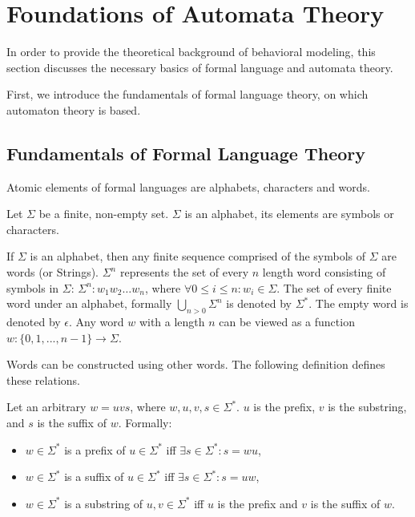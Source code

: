\section{Foundations of Automata Theory}
In order to provide the theoretical background of behavioral modeling, this section discusses the necessary basics of formal language and automata theory.

First, we introduce the fundamentals of formal language theory, on which automaton theory is based. 

\subsection{Fundamentals of Formal Language Theory}
Atomic elements of formal languages are alphabets, characters and words.

\begin{definition}[Alphabet]
	Let $\Sigma$ be a finite, non-empty set. $\Sigma$ is an alphabet, its elements are symbols or characters.
\end{definition}

\begin{definition}[Word]
	If $\Sigma$ is an alphabet, then any finite sequence comprised of the symbols of $\Sigma$ are words (or Strings). $\Sigma^{n}$ represents the set of every $n$ length word consisting of symbols in $\Sigma$: $\Sigma^{n}: w_1w_2\ldots w_n$, where $\forall 0 \leq i \leq n: w_i \in \Sigma$. The set of every finite word under an alphabet, formally $\bigcup\limits_{n>0}^{} \Sigma^{n}$ is denoted by $\Sigma^{*}$. The empty word is denoted by $\epsilon$. Any word $w$ with a length $n$ can be viewed as a function $w: \{0, 1, ..., n-1\} \rightarrow \Sigma$.
\end{definition}

Words can be constructed using other words. The following definition defines these relations.

\begin{definition}
	Let an arbitrary $w = uvs$, where $w, u, v, s\in\Sigma^*$. $u$ is the prefix, $v$ is the substring, and $s$ is the suffix of $w$. Formally:
	\begin{itemize}
		\item $w\in\Sigma^*$ is a prefix of $u\in\Sigma^*$ iff $\exists s\in\Sigma^*: s=wu$,
		\item $w\in\Sigma^*$ is a suffix of $u\in\Sigma^*$ iff $\exists s\in\Sigma^*: s=uw$,
		\item $w\in\Sigma^*$ is a substring of $u, v\in\Sigma^*$ iff $u$ is the prefix and $v$ is the suffix of $w$.
	\end{itemize}
\end{definition}

